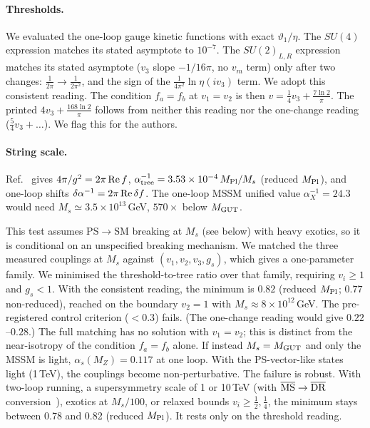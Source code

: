 \documentclass[aps,prd,twocolumn,superscriptaddress,nofootinbib,showkeys]{revtex4-2}
\begin{document}
\paragraph{Thresholds.} We evaluated the one-loop gauge kinetic functions with exact $\vartheta_1/\eta$. The $SU(4)$ expression matches its stated asymptote to $10^{-7}$. The $SU(2)_{L,R}$ expression matches its stated asymptote ($v_3$ slope $-1/16\pi$, no $v_m$ term) only after two changes: $\tfrac1{2\pi}\to\tfrac1{2\pi^2}$, and the sign of the $\tfrac1{4\pi^2}\ln\eta(iv_3)$ term. We adopt this consistent reading. The condition $f_a=f_b$ at $v_1=v_2$ is then $v=\tfrac14v_3+\tfrac{7\ln2}{\pi}$. The printed $4v_3+\tfrac{168\ln2}{\pi}$ follows from neither this reading nor the one-change reading ($\tfrac54v_3+\ldots$). We flag this for the authors.

\paragraph{String scale.} Ref.~\cite{HRS} gives $4\pi/g^2=2\pi\,{\rm Re}\,f$, $\alpha^{-1}_{\rm tree}=3.53\times10^{-4}\,M_{\rm Pl}/M_s$ (reduced $M_{\rm Pl}$), and one-loop shifts $\delta\alpha^{-1}=2\pi\,{\rm Re}\,\delta f$. The one-loop MSSM unified value $\alpha_X^{-1}=24.3$ would need $M_s\simeq3.5\times10^{13}$\,GeV, $570\times$ below $M_{\rm GUT}$.

This test assumes PS$\to$SM breaking at $M_s$ (see below) with heavy exotics, so it is conditional on an unspecified breaking mechanism. We matched the three measured couplings at $M_s$ against $(v_1,v_2,v_3,g_s)$, which gives a one-parameter family. We minimised the threshold-to-tree ratio over that family, requiring $v_i\ge1$ and $g_s<1$. With the consistent reading, the minimum is $0.82$ (reduced $M_{\rm Pl}$; $0.77$ non-reduced), reached on the boundary $v_2=1$ with $M_s\approx8\times10^{12}$\,GeV. The pre-registered control criterion ($<0.3$) fails. (The one-change reading would give $0.22$--$0.28$.) The full matching has no solution with $v_1=v_2$; this is distinct from the near-isotropy of the condition $f_a=f_b$ alone. If instead $M_s=M_{\rm GUT}$ and only the MSSM is light, $\alpha_s(M_Z)=0.117$ at one loop. With the PS-vector-like states light (1\,TeV), the couplings become non-perturbative. The failure is robust. With two-loop running, a supersymmetry scale of 1 or 10\,TeV (with $\overline{\rm MS}\to\overline{\rm DR}$ conversion~\cite{MV}), exotics at $M_s/100$, or relaxed bounds $v_i\ge\tfrac12,\tfrac14$, the minimum stays between 0.78 and 0.82 (reduced $M_{\rm Pl}$). It rests only on the threshold reading.
\end{document}
